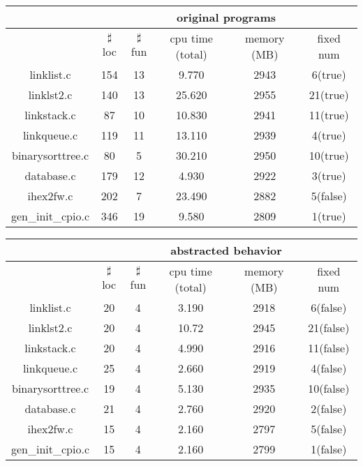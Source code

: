 \begin{table}
\begin{tabular}{|c|c|c|c|c|c|}
\hline
& \multicolumn{5}{|c|}{original programs}  \\
\hline
 & $\sharp$loc & $\sharp$fun & cpu time (total) & memory (MB) & fixed num \\
\hline
linklist.c & 154 & 13 & 9.770 & 2943 & 6(true)  \\
\hline
linklst2.c & 140 & 13 & 25.620 & 2955 & 21(true) \\
\hline
linkstack.c  & 87 & 10 & 10.830 & 2941 & 11(true) \\
\hline
linkqueue.c & 119 & 11 & 13.110 & 2939 & 4(true) \\
\hline
binarysorttree.c & 80 & 5 & 30.210 & 2950 & 10(true)  \\
\hline
database.c & 179 & 12 & 4.930 & 2922 & 3(true) \\
\hline
ihex2fw.c & 202 & 7 & 23.490 & 2882 & 5(false) \\
\hline
gen\_init\_cpio.c & 346 & 19 & 9.580 & 2809 & 1(true) \\
\hline
\end{tabular}
\end{table}

\begin{table}
\begin{tabular}{|c|c|c|c|c|c|}
\hline
&\multicolumn{5}{|c|}{abstracted behavior} \\
\hline
 &$\sharp$loc & $\sharp$fun & cpu time (total) & memory (MB) & fixed num \\
\hline
linklist.c &  20 & 4 & 3.190 & 2918 & 6(false) \\
\hline
linklst2.c & 20 & 4 & 10.72 & 2945 & 21(false) \\
\hline
linkstack.c & 20 & 4 & 4.990 & 2916 & 11(false) \\
\hline
linkqueue.c & 25 & 4 & 2.660 & 2919 & 4(false) \\
\hline
binarysorttree.c & 19 & 4 & 5.130 & 2935 & 10(false) \\
\hline
database.c  & 21 & 4 & 2.760 & 2920 & 2(false) \\
\hline
ihex2fw.c  & 15 & 4 & 2.160 & 2797 & 5(false) \\
\hline
gen\_init\_cpio.c & 15 & 4 & 2.160 & 2799 & 1(false) \\
\hline
\end{tabular}
\end{table}


